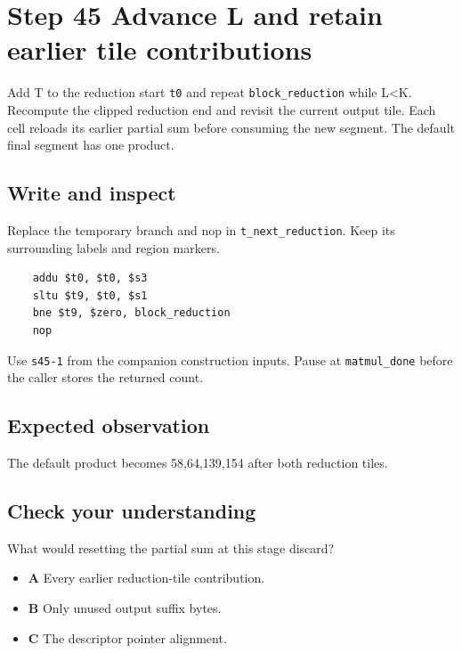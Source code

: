 \section{Step 45 Advance L and retain earlier tile contributions}\label{matmul-s45}

Add T to the reduction start \texttt{t0} and repeat \texttt{block\_reduction} while L<K. Recompute the clipped reduction end and revisit the current output tile. Each cell reloads its earlier partial sum before consuming the new segment. The default final segment has one product.

\subsection{Write and inspect}
Replace the temporary branch and nop in \texttt{t\_next\_reduction}. Keep its surrounding labels and region markers.

\begin{verbatim}
    addu $t0, $t0, $s3
    sltu $t9, $t0, $s1
    bne $t9, $zero, block_reduction
    nop
\end{verbatim}
Use \texttt{s45-1} from the companion construction inputs. Pause at \texttt{matmul\_done} before the caller stores the returned count.

\subsection{Expected observation}
The default product becomes 58,64,139,154 after both reduction tiles.

\subsection{Check your understanding}
What would resetting the partial sum at this stage discard?

\begin{itemize}
  \item \textbf{A} Every earlier reduction-tile contribution.
  \item \textbf{B} Only unused output suffix bytes.
  \item \textbf{C} The descriptor pointer alignment.
\end{itemize}
